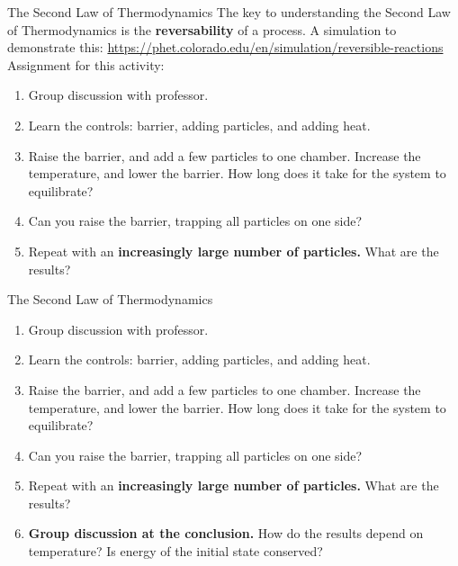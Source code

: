\documentclass{beamer}
\begin{document}
\begin{frame}{The Second Law of Thermodynamics}
\small
The key to understanding the \alert{Second Law of Thermodynamics} is the \textbf{reversability} of a process.  A simulation to demonstrate this:
\url{https://phet.colorado.edu/en/simulation/reversible-reactions} \\ \vspace{0.5cm}
Assignment for this activity:
\begin{enumerate}
\item Group discussion with professor.
\item Learn the controls: barrier, adding particles, and adding heat.
\item Raise the barrier, and add a few particles to one chamber.  Increase the temperature, and lower the barrier.  How long does it take for the system to equilibrate?
\item Can you raise the barrier, trapping all particles on one side?
\item Repeat with an \textbf{increasingly large number of particles.}  What are the results?
\end{enumerate}
\end{frame}

\begin{frame}{The Second Law of Thermodynamics}
\small
\begin{enumerate}
\item Group discussion with professor.
\item Learn the controls: barrier, adding particles, and adding heat.
\item Raise the barrier, and add a few particles to one chamber.  Increase the temperature, and lower the barrier.  How long does it take for the system to equilibrate?
\item Can you raise the barrier, trapping all particles on one side?
\item Repeat with an \textbf{increasingly large number of particles.}  What are the results?
\item \textbf{Group discussion at the conclusion.}  How do the results depend on temperature?  Is energy of the initial state conserved?
\end{enumerate}
\end{frame}
\end{document}

